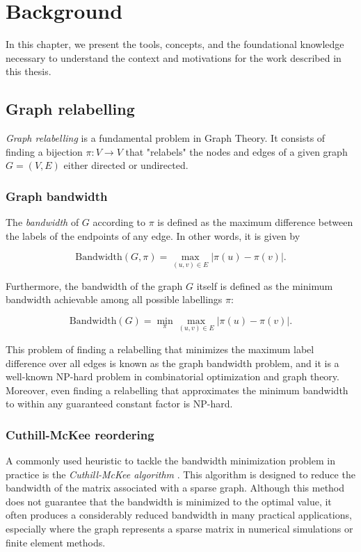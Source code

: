 \chapter{Background}

In this chapter, we present the tools, concepts, and the foundational knowledge necessary to understand the context and motivations for the work described in this thesis.

\section{Graph relabelling}\label{sec:graphrelabelling}

\emph{Graph relabelling} is a fundamental problem in Graph Theory. It consists of finding a bijection $\pi: V \to V$ that "relabels" the nodes and edges of a given graph $G = (V, E)$ either directed or undirected.

\subsection{Graph bandwidth}

The \emph{bandwidth} of \(G\) according to \(\pi\) is defined as the maximum difference between the labels of the endpoints of any edge. In other words, it is given by

\[
\mathrm{Bandwidth}(G, \pi) = \max_{(u, v) \in E} |\pi(u) - \pi(v)|.
\]

Furthermore, the bandwidth of the graph \(G\) itself is defined as the minimum bandwidth achievable among all possible labellings \(\pi\):

\[
\mathrm{Bandwidth}(G) = \min_{\pi} \max_{(u, v) \in E} |\pi(u) - \pi(v)|.
\]

This problem of finding a relabelling that minimizes the maximum label difference over all edges is known as the graph bandwidth problem, and it is a well-known NP-hard problem \cite{bandwidth_np_complete} in combinatorial optimization and graph theory. Moreover, even finding a relabelling that approximates the minimum bandwidth to within any guaranteed constant factor is NP-hard.

\subsection{Cuthill-McKee reordering}
A commonly used heuristic to tackle the bandwidth minimization problem in practice is the \emph{Cuthill-McKee algorithm} \cite{cuthill}. This algorithm is designed to reduce the bandwidth of the matrix associated with a sparse graph. Although this method does not guarantee that the bandwidth is minimized to the optimal value, it often produces a considerably reduced bandwidth in many practical applications, especially where the graph represents a sparse matrix in numerical simulations or finite element methods.

